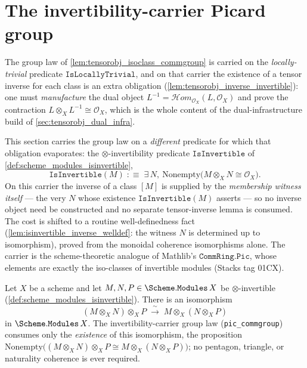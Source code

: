 \section{The invertibility-carrier Picard group}
\label{sec:tensorobj_pic_carrier}

The group law of \cref{lem:tensorobj_isoclass_commgroup} is carried on the
\emph{locally-trivial} predicate \(\mathtt{IsLocallyTrivial}\), and on that carrier
the existence of a tensor inverse for each class is an extra obligation
(\cref{lem:tensorobj_inverse_invertible}): one must \emph{manufacture} the dual
object \(L^{-1} = \mathcal{H}om_{\mathcal{O}_X}(L, \mathcal{O}_X)\) and prove the
contraction \(L \otimes_X L^{-1} \cong \mathcal{O}_X\), which is the whole content of
the dual-infrastructure build of \cref{sec:tensorobj_dual_infra}.

This section carries the group law on a \emph{different} predicate for which that
obligation evaporates: the \(\otimes\)-invertibility predicate
\(\mathtt{IsInvertible}\) of \cref{def:scheme_modules_isinvertible},
\[
  \mathtt{IsInvertible}(M)
  \;:\equiv\;
  \exists\, N,\ \mathrm{Nonempty}\bigl(M \otimes_X N \cong \mathcal{O}_X\bigr).
\]
On this carrier the inverse of a class \([M]\) is supplied by the \emph{membership
witness itself} --- the very \(N\) whose existence \(\mathtt{IsInvertible}(M)\)
asserts --- so no inverse object need be constructed and no separate
tensor-inverse lemma is consumed. The cost is shifted to a routine
well-definedness fact (\cref{lem:isinvertible_inverse_welldef}: the witness \(N\) is
determined up to isomorphism), proved from the monoidal coherence isomorphisms
alone. The carrier is the scheme-theoretic analogue of Mathlib's
\(\mathtt{CommRing.Pic}\), whose elements are exactly the iso-classes of invertible
modules (Stacks tag 01CX).

\begin{lemma}\leanok
  \label{lem:tensorobj_assoc_iso_invertible}
  Let \(X\) be a scheme and let
  \(M, N, P \in \Scheme.\mathtt{Modules}\,X\) be \(\otimes\)-invertible
  (\cref{def:scheme_modules_isinvertible}). There is an isomorphism
  \[
    (M \otimes_X N) \otimes_X P
      \;\xrightarrow{\ \sim\ }\;
    M \otimes_X (N \otimes_X P)
  \]
  in \(\Scheme.\mathtt{Modules}\,X\). The invertibility-carrier group law
  (\texttt{pic\_commgroup}) consumes only the \emph{existence} of this
  isomorphism, the proposition \(\mathrm{Nonempty}\bigl((M \otimes_X N) \otimes_X P
  \cong M \otimes_X (N \otimes_X P)\bigr)\); no pentagon, triangle, or naturality
  coherence is ever required.
\end{lemma}


